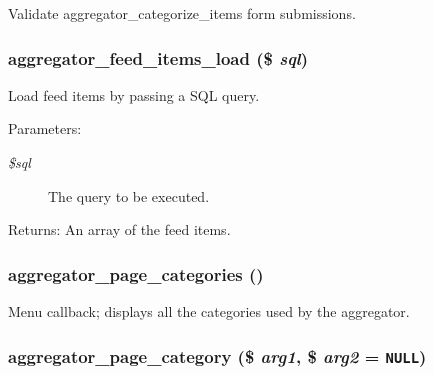 Validate aggregator\_\-categorize\_\-items form submissions. \hypertarget{aggregator_8pages_8inc_3009454bf1b054a8b8a385a3a8a36b79}{
\subsubsection[{aggregator\_\-feed\_\-items\_\-load}]{\setlength{\rightskip}{0pt plus 5cm}aggregator\_\-feed\_\-items\_\-load (\$ {\em sql})}}
\label{aggregator_8pages_8inc_3009454bf1b054a8b8a385a3a8a36b79}


Load feed items by passing a SQL query.

\begin{Desc}
\item[Parameters:]
\begin{description}
\item[{\em \$sql}]The query to be executed. \end{description}
\end{Desc}
\begin{Desc}
\item[Returns:]An array of the feed items. \end{Desc}
\hypertarget{aggregator_8pages_8inc_180a110c19ebe4eeaacaa61aff7b42e5}{
\subsubsection[{aggregator\_\-page\_\-categories}]{\setlength{\rightskip}{0pt plus 5cm}aggregator\_\-page\_\-categories ()}}
\label{aggregator_8pages_8inc_180a110c19ebe4eeaacaa61aff7b42e5}


Menu callback; displays all the categories used by the aggregator. \hypertarget{aggregator_8pages_8inc_69a965de4121426852ef208e064119bc}{
\subsubsection[{aggregator\_\-page\_\-category}]{\setlength{\rightskip}{0pt plus 5cm}aggregator\_\-page\_\-category (\$ {\em arg1}, \/  \$ {\em arg2} = {\tt NULL})}}
\label{aggregator_8pages_8inc_69a965de4121426852ef208e064119bc}


